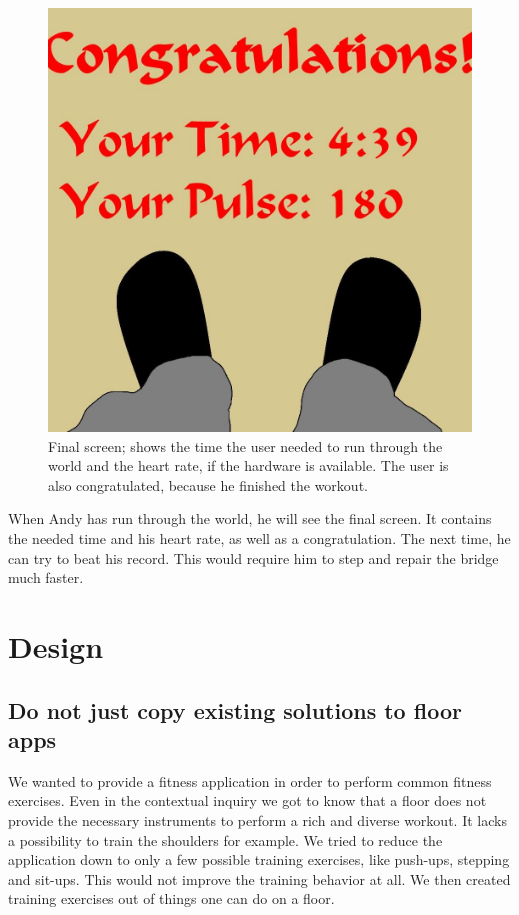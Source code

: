 \documentclass{sigchi}
\begin{document}
    \begin{figure}[htb]
      \centering
      \includegraphics[width=0.32\linewidth]{Image_17.jpg}
      \caption{Final screen; shows the time the user needed to run through the world and the heart rate, if the hardware is available. The user is also congratulated, because he finished the workout.}
      \label{fig:end}
    \end{figure}

    When Andy has run through the world, he will see the final screen. It contains the needed time and his heart rate, as well as a congratulation. The next time, he can try to beat his record. This would require him to step and repair the bridge much faster. 

\clearpage

\section{Design}

  \subsection{Do not just copy existing solutions to floor apps} %
  \label{sub:do_not_just_copy_existing_solution_to_floor_apps}
  
    We wanted to provide a fitness application in order to perform common fitness exercises. Even in the contextual inquiry we got to know that a floor does not provide the necessary instruments to perform a rich and diverse workout. It lacks a possibility to train the shoulders for example. We tried to reduce the application down to only a few possible training exercises, like push-ups, stepping and sit-ups. This would not improve the training behavior at all. We then created training exercises out of things one can do on a floor.
\end{document}

